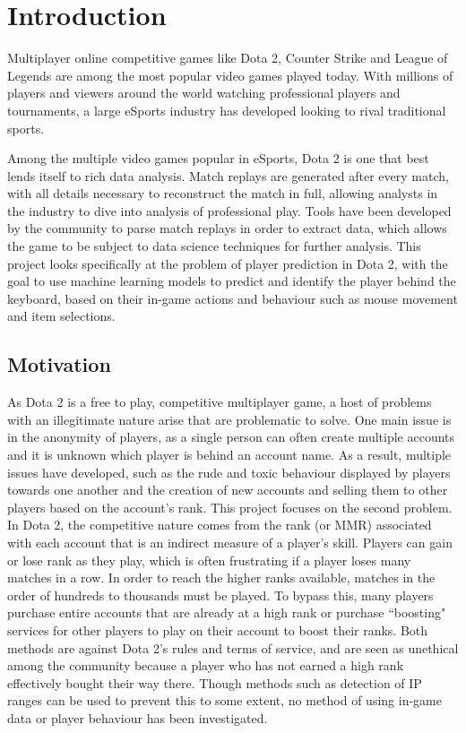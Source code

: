 \documentclass[Report.tex]{subfiles}
\begin{document}
\section{Introduction}
Multiplayer online competitive games like Dota 2, Counter Strike and League of Legends are among the most popular video games played today. With millions of players and viewers around the world watching professional players and tournaments, a large eSports industry has developed looking to rival traditional sports. 

Among the multiple video games popular in eSports, Dota 2 is one that best lends itself to rich data analysis. Match replays are generated after every match, with all details necessary to reconstruct the match in full, allowing analysts in the industry to dive into analysis of professional play. Tools have been developed by the community to parse match replays in order to extract data, which allows the game to be subject to data science techniques for further analysis. This project looks specifically at the problem of player prediction in Dota 2, with the goal to use machine learning models to predict and identify the player behind the keyboard, based on their in-game actions and behaviour such as mouse movement and item selections. 

\subsection{Motivation}
As Dota 2 is a free to play, competitive multiplayer game, a host of problems with an illegitimate nature arise that are problematic to solve. One main issue is in the anonymity of players, as a single person can often create multiple accounts and it is unknown which player is behind an account name. As a result, multiple issues have developed, such as the rude and toxic behaviour displayed by players towards one another \cite{toxic} and the creation of new accounts and selling them to other players based on the account's rank. This project focuses on the second problem. In Dota 2, the competitive nature comes from the rank (or MMR) associated with each account that is an indirect measure of a player's skill. Players can gain or lose rank as they play, which is often frustrating if a player loses many matches in a row. In order to reach the higher ranks available, matches in the order of hundreds to thousands must be played. To bypass this, many players purchase entire accounts that are already at a high rank or purchase ``boosting" services for other players to play on their account to boost their ranks. Both methods are against Dota 2's rules and terms of service, and are seen as unethical among the community because a player who has not earned a high rank effectively bought their way there. Though methods such as detection of IP ranges can be used to prevent this to some extent, no method of using in-game data or player behaviour has been investigated. 
\end{document}
